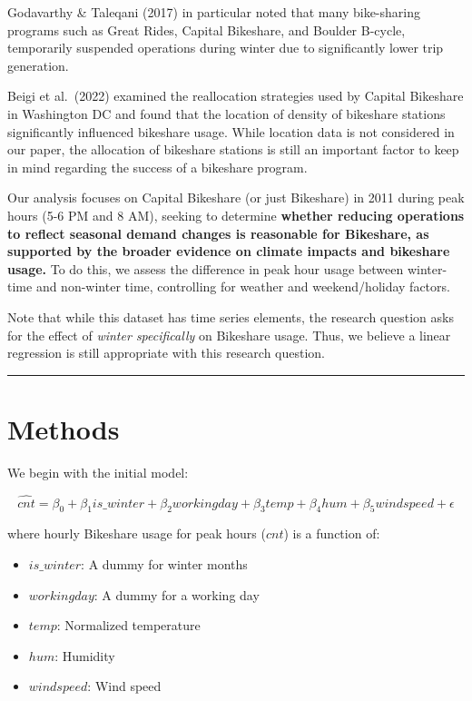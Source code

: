 \documentclass[
  10pt,
]{article}
\providecommand{\tightlist}{%
  \setlength{\itemsep}{0pt}\setlength{\parskip}{0pt}}
\begin{document}
Godavarthy \& Taleqani (2017) in particular noted that many bike-sharing
programs such as Great Rides, Capital Bikeshare, and Boulder B-cycle,
temporarily suspended operations during winter due to significantly
lower trip generation.

Beigi et al.~(2022) examined the reallocation strategies used by Capital
Bikeshare in Washington DC and found that the location of density of
bikeshare stations significantly influenced bikeshare usage. While
location data is not considered in our paper, the allocation of
bikeshare stations is still an important factor to keep in mind
regarding the success of a bikeshare program.

Our analysis focuses on Capital Bikeshare (or just Bikeshare) in 2011
during peak hours (5-6 PM and 8 AM), seeking to determine
\textbf{whether reducing operations to reflect seasonal demand changes
is reasonable for Bikeshare, as supported by the broader evidence on
climate impacts and bikeshare usage.} To do this, we assess the
difference in peak hour usage between winter-time and non-winter time,
controlling for weather and weekend/holiday factors.

Note that while this dataset has time series elements, the research
question asks for the effect of \emph{winter specifically} on Bikeshare
usage. Thus, we believe a linear regression is still appropriate with
this research question.

\begin{center}\rule{0.5\linewidth}{0.5pt}\end{center}

\section{Methods}\label{methods}

We begin with the initial model:

\[
\hat{cnt} = \beta_0 + \beta_1 is\_winter + \beta_2 workingday + \beta_3 temp + \beta_4 hum + \beta_5 windspeed + \epsilon
\]

where hourly Bikeshare usage for peak hours (\(cnt\)) is a function of:

\begin{itemize}
\tightlist
\item
  \(is\_winter\): A dummy for winter months
\item
  \(workingday\): A dummy for a working day
\item
  \(temp\): Normalized temperature
\item
  \(hum\): Humidity
\item
  \(windspeed\): Wind speed
\end{itemize}
\end{document}
